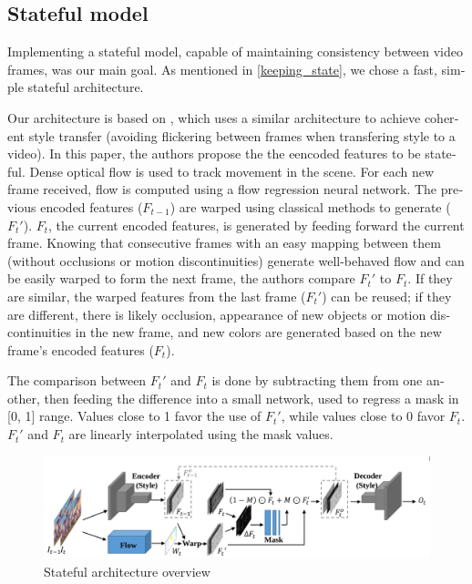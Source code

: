 \documentclass[12pt,openright,oneside,a4paper,english]{abntex2}
\begin{document}
\begin{otherlanguage}{english}
    \subsection{Stateful model}

    Implementing a stateful model, capable of maintaining consistency between video frames, was our main goal. As mentioned in \ref{keeping_state}, we chose a fast, simple stateful architecture.

    Our architecture is based on \cite{MSFT_transfer}, which uses a similar architecture to achieve coherent style transfer (avoiding flickering between frames when transfering style to a video). In this paper, the authors propose the the eencoded features to be stateful. Dense optical flow is used to track movement in the scene. For each new frame received, flow is computed using a flow regression neural network. The previous encoded features ($F_{t-1}$) are warped using classical methods to generate ($F_t'$). $F_t$, the current encoded features, is generated by feeding forward the current frame. Knowing that consecutive frames with an easy mapping between them (without occlusions or motion discontinuities) generate well-behaved flow and can be easily warped to form the next frame, the authors compare $F_t'$ to $F_t$. If they are similar, the warped features from the last frame ($F_t'$) can be reused; if they are different, there is likely occlusion, appearance of new objects or motion discontinuities in the new frame, and new colors are generated based on the new frame's encoded features ($F_t$).

    The comparison between $F_t'$ and $F_t$ is done by subtracting them from one another, then feeding the difference into a small network, used to regress a mask in [0, 1] range. Values close to 1 favor the use of $F_t'$, while values close to 0 favor $F_t$. $F_t'$ and $F_t$ are linearly interpolated using the mask values.

    \begin{figure}[!htb]
    \centering
    \includegraphics[width=\textwidth]{optical_flow_arch}
    \caption{Stateful architecture overview \cite{MSFT_transfer}}
    \label{optical_flow_arch}
    \end{figure}


\end{otherlanguage}
\end{document}
